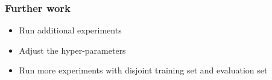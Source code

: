 \documentclass[11pt,english]{beamer}
\begin{document}
\begin{frame}
  \frametitle{Further work}
  \begin{itemize}
    \item Run additional experiments
    \item Adjust the hyper-parameters
    \item Run more experiments with disjoint training set and evaluation set
  \end{itemize}
\end{frame}
\end{document}
